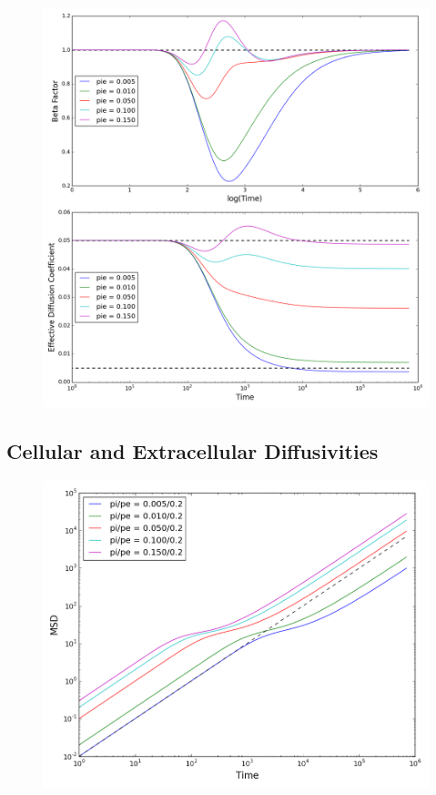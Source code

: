 	\begin{figure}[h]
		\centering
		\includegraphics[width=1.0\linewidth]{../images/1D/pie_beta_deff_1D}
		\caption{}
		\label{fig:pie_beta_deff_1D}
	\end{figure}

\subsection{Cellular and Extracellular Diffusivities}
	
	\begin{figure}[h]
		\centering
		\includegraphics[width=1.0\linewidth]{../images/1D/pipe_msd_1D}
		\caption{}
		\label{fig:pipe_msd_1D}
	\end{figure}
	
